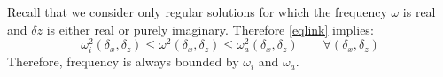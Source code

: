 \documentclass[a4paper,11pt]{article}
\begin{document}

Recall that we consider only regular solutions for which the frequency $\omega$ is real and $\delta z$ is either real or purely imaginary.
Therefore \ref{eqlink} implies:
\[
\omega_i^2(\delta_x, \delta_z)\le \omega^2(\delta_x, \delta_z) \le \omega_a^2(\delta_x, \delta_z) \qquad\forall (\delta_x, \delta_z)
\]
Therefore, frequency is always bounded by $\omega_i$ and $\omega_a$.\\
\end{document}

